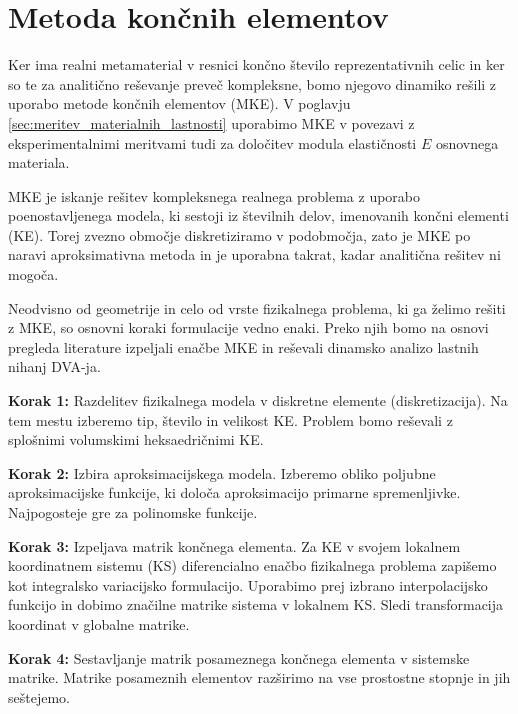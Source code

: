 \chapter{Metoda končnih elementov}\label{sec:MKE}
    
    Ker ima realni metamaterial v resnici končno število reprezentativnih celic in ker so te za analitično reševanje preveč kompleksne, bomo njegovo dinamiko rešili z uporabo metode končnih elementov (MKE). V poglavju \ref{sec:meritev_materialnih_lastnosti} uporabimo MKE v povezavi z eksperimentalnimi meritvami tudi za določitev modula elastičnosti $E$ osnovnega materiala.
    
    MKE je iskanje rešitev kompleksnega realnega problema z uporabo poenostavljenega modela, ki sestoji iz številnih delov, imenovanih končni elementi (KE). Torej zvezno območje diskretiziramo v podobmočja, zato je MKE po naravi aproksimativna metoda in je uporabna takrat, kadar analitična rešitev ni mogoča.
    
    Neodvisno od geometrije in celo od vrste fizikalnega problema, ki ga želimo rešiti z MKE, so osnovni koraki formulacije vedno enaki. Preko njih bomo na osnovi pregleda literature \cite{rao2010theFEMinEngineering} izpeljali enačbe MKE in reševali dinamsko analizo lastnih nihanj DVA-ja. 
    
    \textbf{Korak 1:} Razdelitev fizikalnega modela v diskretne elemente (diskretizacija).\smallskip\newline
    Na tem mestu izberemo tip, število in velikost KE. Problem bomo reševali z splošnimi volumskimi heksaedričnimi KE. 
            
    \textbf{Korak 2:} Izbira aproksimacijskega modela.\smallskip\newline
    Izberemo obliko poljubne aproksimacijske funkcije, ki določa aproksimacijo primarne spremenljivke. Najpogosteje gre za polinomske funkcije.

    \textbf{Korak 3:} Izpeljava matrik končnega elementa.\smallskip\newline
    Za KE v svojem lokalnem koordinatnem sistemu (KS) diferencialno enačbo fizikalnega problema zapišemo kot integralsko variacijsko formulacijo. Uporabimo prej izbrano interpolacijsko funkcijo in dobimo značilne matrike sistema v lokalnem KS. Sledi transformacija koordinat v globalne matrike. 

    \textbf{Korak 4:} Sestavljanje matrik posameznega končnega elementa v sistemske matrike.\smallskip\newline
    Matrike posameznih elementov razširimo na vse prostostne stopnje in jih seštejemo.

